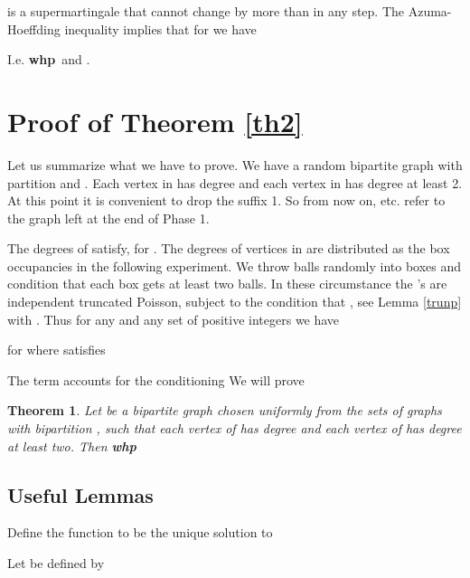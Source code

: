 \documentclass[11pt]{article}
\def\whp{{\bf whp}}
\newtheorem{theorem}{Theorem}
\begin{document}
is a supermartingale that cannot change by
more than  in any step. The Azuma-Hoeffding inequality implies that for  we have

 
I.e. \whp\  and .
\section{Proof of Theorem \ref{th2}}\label{pot2}
Let us summarize what we have to prove.
We have a random bipartite graph  with partition  and .
Each vertex in  has degree  and each vertex in  has degree at least 2.
At this point it is convenient to drop the suffix 1. So from now on,  etc. refer to the graph left at the end of Phase 1.

The degrees of  satisfy,  for . The degrees of vertices in  are distributed as the 
box occupancies  in the following experiment. We throw  balls randomly into  boxes and condition that 
each box gets
at least two balls.  In these circumstance the 's are independent truncated Poisson, subject to the 
condition that , see Lemma \ref{trunp} with . 
Thus for any  and any set of positive integers  we have 
 
for 
 where  satisfies 

The  term accounts for the conditioning 
We will prove
\begin{theorem}\label{min}
Let  be a bipartite graph chosen uniformly from the sets of graphs with bipartition , 
such that each vertex of  has degree  and each vertex of  has degree at least two. Then \whp

\end{theorem}
\subsection{Useful Lemmas}
Define the function  to be the unique solution to 

Let  be defined by
\end{document}

